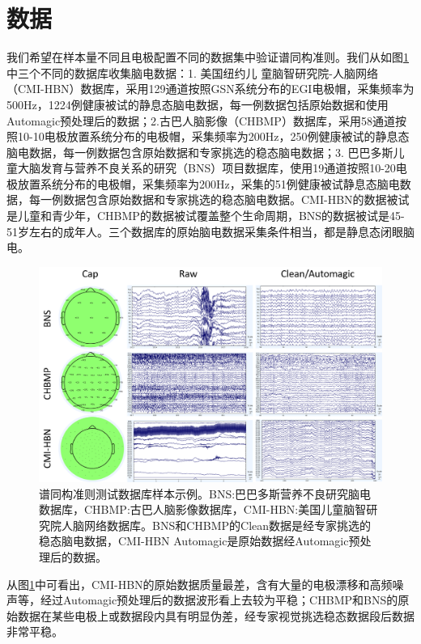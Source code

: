 \section{数据}
我们希望在样本量不同且电极配置不同的数据集中验证谱同构准则。我们从如图\ref{5:database}中三个不同的数据库收集脑电数据：1. 美国纽约儿
童脑智研究院-人脑网络（CMI-HBN）数据库，采用129通道按照GSN系统分布的EGI电极帽，采集频率为500Hz，1224例健康被试的静息态脑电数据，每一例数据包括原始数据和使用Automagic预处理后的数据；2.古巴人脑影像（CHBMP）数据库，采用58通道按照10-10电极放置系统分布的电极帽，采集频率为200Hz，250例健康被试的静息态脑电数据，每一例数据包含原始数据和专家挑选的稳态脑电数据；3. 巴巴多斯儿童大脑发育与营养不良关系的研究（BNS）项目数据库，使用19通道按照10-20电极放置系统分布的电极帽，采集频率为200Hz，采集的51例健康被试静息态脑电数据，每一例数据包含原始数据和专家挑选的稳态脑电数据。CMI-HBN的数据被试是儿童和青少年，CHBMP的数据被试覆盖整个生命周期，BNS的数据被试是45-51岁左右的成年人。三个数据库的原始脑电数据采集条件相当，都是静息态闭眼脑电。
\begin{figure}[!h]
\includegraphics[width=15cm]{pic/palos/data.png}
\caption{谱同构准则测试数据库样本示例。BNS:巴巴多斯营养不良研究脑电数据库，CHBMP:古巴人脑影像数据库，CMI-HBN:美国儿童脑智研究院人脑网络数据库。BNS和CHBMP的Clean数据是经专家挑选的稳态脑电数据，CMI-HBN Automagic是原始数据经Automagic预处理后的数据。}
\label{5:database}
\end{figure}

从图\ref{5:database}中可看出，CMI-HBN的原始数据质量最差，含有大量的电极漂移和高频噪声等，经过Automagic预处理后的数据波形看上去较为平稳；CHBMP和BNS的原始数据在某些电极上或数据段内具有明显伪差，经专家视觉挑选稳态数据段后数据非常平稳。

